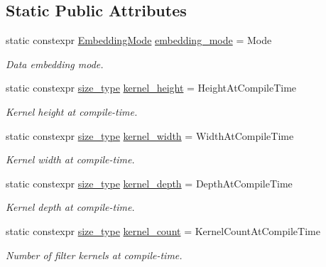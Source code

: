 \subsection*{Static Public Attributes}
\begin{DoxyCompactItemize}
\item 
static constexpr \hyperlink{namespaceffnn_1_1layer_1_1convolution_ad420d4eb8edd7c254d1f0aaaad81017f}{Embedding\-Mode} \hyperlink{structffnn_1_1layer_1_1convolution_1_1filter_1_1options_a364919ad62fa093fbf5d142bd4f37d6e}{embedding\-\_\-mode} = Mode
\begin{DoxyCompactList}\small\item\em Data embedding mode. \end{DoxyCompactList}\item 
static constexpr \hyperlink{namespaceffnn_a63b90a2fd70eb76684eac482a51633e5}{size\-\_\-type} \hyperlink{structffnn_1_1layer_1_1convolution_1_1filter_1_1options_a89572b22e67e07c6f68d5c51070b0dbf}{kernel\-\_\-height} = Height\-At\-Compile\-Time
\begin{DoxyCompactList}\small\item\em Kernel height at compile-\/time. \end{DoxyCompactList}\item 
static constexpr \hyperlink{namespaceffnn_a63b90a2fd70eb76684eac482a51633e5}{size\-\_\-type} \hyperlink{structffnn_1_1layer_1_1convolution_1_1filter_1_1options_afd97cb92020381b3f2489b92946fdc11}{kernel\-\_\-width} = Width\-At\-Compile\-Time
\begin{DoxyCompactList}\small\item\em Kernel width at compile-\/time. \end{DoxyCompactList}\item 
static constexpr \hyperlink{namespaceffnn_a63b90a2fd70eb76684eac482a51633e5}{size\-\_\-type} \hyperlink{structffnn_1_1layer_1_1convolution_1_1filter_1_1options_a699036320138871693bcd0ecfb977d6b}{kernel\-\_\-depth} = Depth\-At\-Compile\-Time
\begin{DoxyCompactList}\small\item\em Kernel depth at compile-\/time. \end{DoxyCompactList}\item 
static constexpr \hyperlink{namespaceffnn_a63b90a2fd70eb76684eac482a51633e5}{size\-\_\-type} \hyperlink{structffnn_1_1layer_1_1convolution_1_1filter_1_1options_a615d2970fd2d4ded6bbacff86d6f71e4}{kernel\-\_\-count} = Kernel\-Count\-At\-Compile\-Time
\begin{DoxyCompactList}\small\item\em Number of filter kernels at compile-\/time. \end{DoxyCompactList}\item 

\end{DoxyCompactItemize}
